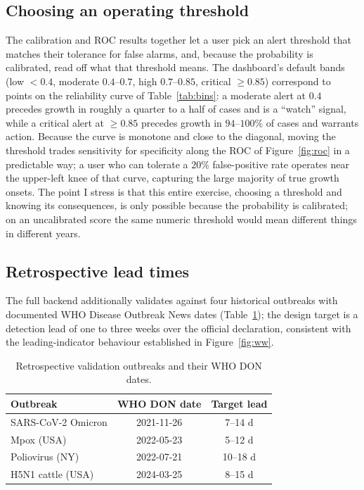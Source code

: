 \documentclass[10pt,twocolumn]{article}
\theoremstyle{definition}
\begin{document}
\subsection{Choosing an operating threshold}
The calibration and ROC results together let a user pick an alert threshold that
matches their tolerance for false alarms, and, because the probability is
calibrated, read off what that threshold means. The dashboard's default bands
(low $<0.4$, moderate $0.4$--$0.7$, high $0.7$--$0.85$, critical $\ge0.85$)
correspond to points on the reliability curve of Table~\ref{tab:bins}: a moderate
alert at $0.4$ precedes growth in roughly a quarter to a half of cases and is a
``watch'' signal, while a critical alert at $\ge0.85$ precedes growth in $94$--$100\%$
of cases and warrants action. Because the curve is monotone and close to the
diagonal, moving the threshold trades sensitivity for specificity along the ROC of
Figure~\ref{fig:roc} in a predictable way; a user who can tolerate a $20\%$
false-positive rate operates near the upper-left knee of that curve, capturing the
large majority of true growth onsets. The point I stress is that this entire
exercise, choosing a threshold and knowing its consequences, is only possible
because the probability is calibrated; on an uncalibrated score the same
numeric threshold would mean different things in different years.

\subsection{Retrospective lead times}
The full backend additionally validates against four historical outbreaks with
documented WHO Disease Outbreak News dates (Table~\ref{tab:lead}); the design
target is a detection lead of one to three weeks over the official declaration,
consistent with the leading-indicator behaviour established in
Figure~\ref{fig:ww}.

\begin{table}[t]
\centering\footnotesize
\caption{Retrospective validation outbreaks and their WHO DON dates.}
\label{tab:lead}
\begin{tabular}{lcc}
\toprule
Outbreak & WHO DON date & Target lead \\
\midrule
SARS-CoV-2 Omicron & 2021-11-26 & 7--14 d \\
Mpox (USA) & 2022-05-23 & 5--12 d \\
Poliovirus (NY) & 2022-07-21 & 10--18 d \\
H5N1 cattle (USA) & 2024-03-25 & 8--15 d \\
\bottomrule
\end{tabular}
\end{table}
\end{document}
